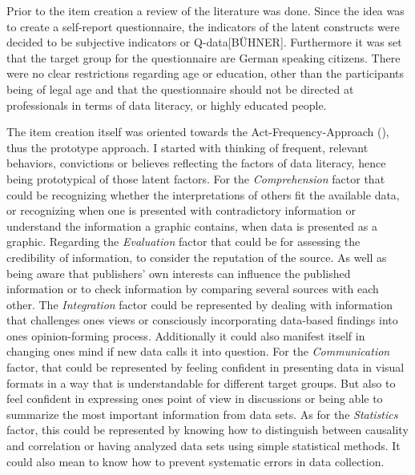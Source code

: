 \documentclass[
  12pt,
  a4paper,
  twoside]{article}
\begin{document}
Prior to the item creation a review of the literature was done. Since the idea was to create a self-report questionnaire, the indicators of the latent constructs were decided to be subjective indicators or Q-data{[}BÜHNER{]}. Furthermore it was set that the target group for the questionnaire are German speaking citizens. There were no clear restrictions regarding age or education, other than the participants being of legal age and that the questionnaire should not be directed at professionals in terms of data literacy, or highly educated people.

The item creation itself was oriented towards the Act-Frequency-Approach (), thus the prototype approach.
I started with thinking of frequent, relevant behaviors, convictions or believes reflecting the factors of data literacy, hence being prototypical of those latent factors.
For the \emph{Comprehension} factor that could be recognizing whether the interpretations of others fit the available data, or recognizing when one is presented with contradictory information or understand the information a graphic contains, when data is presented as a graphic.
Regarding the \emph{Evaluation} factor that could be for assessing the credibility of information, to consider the reputation of the source. As well as being aware that publishers' own interests can influence the published information or to check information by comparing several sources with each other.
The \emph{Integration} factor could be represented by dealing with information that challenges ones views or consciously incorporating data-based findings into ones opinion-forming process. Additionally it could also manifest itself in changing ones mind if new data calls it into question.
For the \emph{Communication} factor, that could be represented by feeling confident in presenting data in visual formats in a way that is understandable for different target groups. But also to feel confident in expressing ones point of view in discussions or being able to summarize the most important information from data sets.
As for the \emph{Statistics} factor, this could be represented by knowing how to distinguish between causality and correlation or having analyzed data sets using simple statistical methods. It could also mean to know how to prevent systematic errors in data collection.
\end{document}
